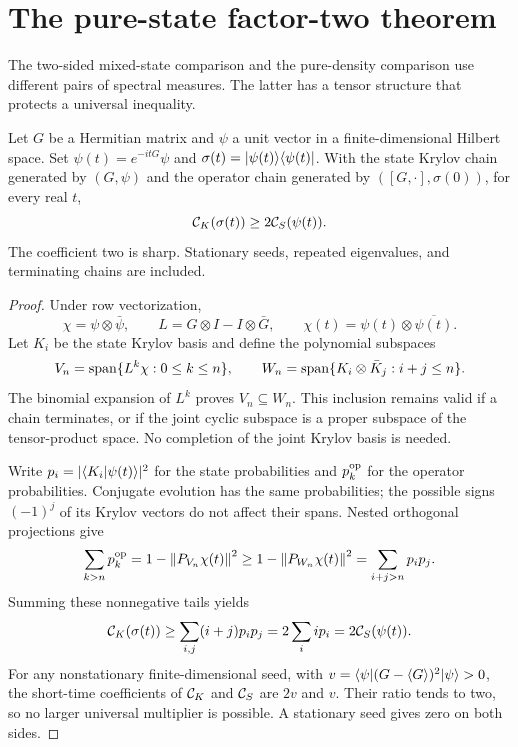 \section{The pure-state factor-two theorem}\label{sec:factor}
The two-sided mixed-state comparison and the pure-density comparison use
different pairs of spectral measures. The latter has a tensor structure
that protects a universal inequality.

\begin{theorem}\label{thm:factor}
Let $G$ be a Hermitian matrix and $\psi$ a unit vector in a finite-dimensional
Hilbert space. Set $\psi(t)=e^{-itG}\psi$ and
$\sigma(t)=\lvert \psi(t)\rangle\langle \psi(t)\rvert$. With the state Krylov chain
generated by $(G,\psi)$ and the operator chain generated by
$([G,\cdot],\sigma(0))$, for every real $t$,
\begin{equation}\label{eq:factor-two}
 \mathcal C_K(\sigma(t))\ge2\mathcal C_S(\psi(t)).
\end{equation}
The coefficient two is sharp. Stationary seeds, repeated eigenvalues, and
terminating chains are included.
\end{theorem}
\begin{proof}
Under row vectorization,
\begin{equation}\label{eq:factor-vectorization}
 \chi=\psi\otimes\bar\psi,\qquad
 L=G\otimes I-I\otimes\bar G,\qquad
 \chi(t)=\psi(t)\otimes\overline{\psi(t)}.
\end{equation}
Let $K_i$ be the state Krylov basis and define the polynomial subspaces
\begin{equation}\label{eq:flags}
 V_n=\operatorname{span}\{L^k\chi:0\le k\le n\},\qquad
 W_n=\operatorname{span}\{K_i\otimes\bar K_j:i+j\le n\}.
\end{equation}
The binomial expansion of $L^k$ proves $V_n\subseteq W_n$. This inclusion
remains valid if a chain terminates, or if the joint cyclic subspace is a
proper subspace of the tensor-product space. No completion of the joint
Krylov basis is needed.

Write $p_i=|\langle K_i\rvert\psi(t)\rangle|^2$ for the state probabilities and
$p_k^{\rm op}$ for the operator probabilities. Conjugate evolution has the
same probabilities; the possible signs $(-1)^j$ of its Krylov vectors do
not affect their spans. Nested orthogonal projections give
\begin{equation}\label{eq:tail-domination}
 \sum_{k>n}p_k^{\rm op}
 =1-\left\lVert P_{V_n}\chi(t)\right\rVert^2
 \ge1-\left\lVert P_{W_n}\chi(t)\right\rVert^2
 =\sum_{i+j>n}p_i p_j.
\end{equation}
Summing these nonnegative tails yields
\begin{equation}\label{eq:tail-sum}
 \mathcal C_K(\sigma(t))\ge\sum_{i,j}(i+j)p_i p_j
 =2\sum_i i p_i=2\mathcal C_S(\psi(t)).
\end{equation}
For any nonstationary finite-dimensional seed, with
$v=\langle \psi\rvert(G-\langle G\rangle)^2\lvert \psi\rangle>0$, the short-time
coefficients of $\mathcal C_K$ and $\mathcal C_S$ are $2v$ and $v$. Their ratio tends to two,
so no larger universal multiplier is possible. A stationary seed gives
zero on both sides.
\end{proof}

